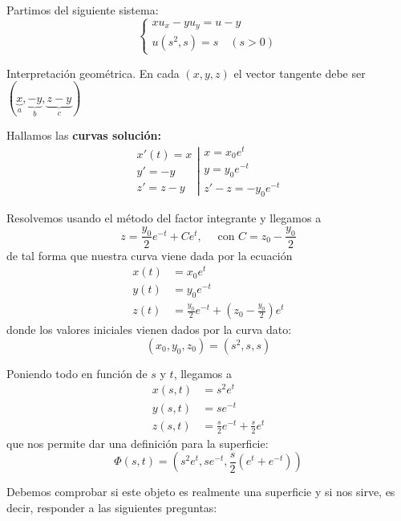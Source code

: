 	\begin{example}
		Partimos del siguiente sistema:
		\begin{equation*}
			\left\{
			\begin{array}{l}
				xu_x - yu_y = u - y \\
				u(s^2,s) = s \quad (s > 0)
			\end{array}
			\right.
		\end{equation*}

		Interpretación geométrica. En cada $(x,y,z)$ el vector tangente debe ser $(\underbrace{x}_{a},\underbrace{-y}_{b},\underbrace{z-y}_{c})$

		Hallamos las \textbf{curvas solución:}
		\begin{equation*}
			\left.
			\begin{array}{rl}
				 x'(t) = x \\
				 y' = -y \\
				 z' = z-y
			\end{array}
			\right|
			\begin{array}{l}
				x = x_0 e^t \\
				y = y_0 e^{-t} \\
				z' -z = -y_0 e^{-t}
			\end{array}
		\end{equation*}

		Resolvemos usando el método del factor integrante y llegamos a \[ z = \frac{y_0}{2} e^{-t} + C e^t , \quad\text{ con } C = z_0 - \frac{y_0}{2} \] de tal forma que nuestra curva viene dada por la ecuación
		\begin{align*}
			x(t) &= x_0 e^t \\
			y(t) &= y_0 e^{-t} \\
			z(t) &= \frac{y_0}{2} e^{-t} + (z_0 - \frac{y_0}{2})e^t
		\end{align*} donde los valores iniciales vienen dados por la curva dato: \[ (x_0,y_0,z_0) = (s^2,s,s) \]

		Poniendo todo en función de $s$ y $t$, llegamos a
		\begin{align*}
		x(s,t) &= s^2 e^t \\
		y(s,t) &= se^{-t} \\
		z(s,t) &= \frac{s}{2}e^{-t} + \frac{s}{2}e^{t}
		\end{align*}
		que nos permite dar una definición para la superficie:
		\[
			\Phi(s,t) = \left(s^2e^t, se^{-t}, \frac{s}{2}(e^t + e^{-t}) \right )
		\]

		\newpage %
		Debemos comprobar si este objeto es realmente una superficie y si nos sirve, es decir, responder a las siguientes preguntas:


\end{example}
